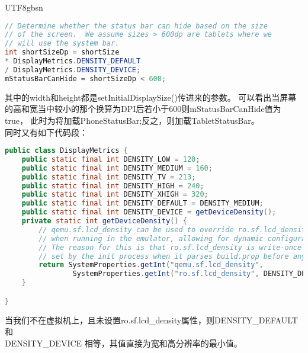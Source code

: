 \documentclass[a4paper,11pt]{article}
\begin{document}
\begin{CJK*}{UTF8}{gbsn}
\begin{enumerate}
\begin{lstlisting}[language=JAVA]
// Determine whether the status bar can hide based on the size
// of the screen.  We assume sizes > 600dp are tablets where we
// will use the system bar.
int shortSizeDp = shortSize
* DisplayMetrics.DENSITY_DEFAULT
/ DisplayMetrics.DENSITY_DEVICE;
mStatusBarCanHide = shortSizeDp < 600; 
\end{lstlisting}
    其中的width和height都是setInitialDisplaySize()传进来的参数。
    可以看出当屏幕的高和宽当中较小的那个换算为DPI后若小于600则mStatusBarCanHide值为true，
    此时为将加载PhoneStatusBar;反之，则加载TabletStatusBar。\\
    同时又有如下代码段：
\begin{lstlisting}[language=JAVA]
public class DisplayMetrics {
    public static final int DENSITY_LOW = 120;
    public static final int DENSITY_MEDIUM = 160;
    public static final int DENSITY_TV = 213;
    public static final int DENSITY_HIGH = 240;
    public static final int DENSITY_XHIGH = 320;
    public static final int DENSITY_DEFAULT = DENSITY_MEDIUM;
    public static final int DENSITY_DEVICE = getDeviceDensity();
    private static int getDeviceDensity() {                                                                                                                                                   
        // qemu.sf.lcd_density can be used to override ro.sf.lcd_density
        // when running in the emulator, allowing for dynamic configurations.
        // The reason for this is that ro.sf.lcd_density is write-once and is
        // set by the init process when it parses build.prop before anything else.
        return SystemProperties.getInt("qemu.sf.lcd_density",
                SystemProperties.getInt("ro.sf.lcd_density", DENSITY_DEFAULT));
    }

}
\end{lstlisting}
    当我们不在虚拟机上，且未设置ro.sf.lcd\_density属性，则DENSITY\_DEFAULT和\\
    DENSITY\_DEVICE
    相等，其值直接为宽和高分辨率的最小值。


\end{enumerate}
\end{CJK*}
\end{document}
